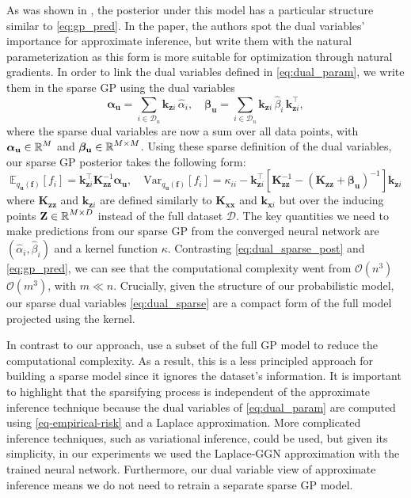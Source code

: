 \documentclass{article}
\newcommand{\dataset}{\ensuremath{\mathcal{D}}}
\newcommand{\mathbold}[1]{\bm{#1}}
\newcommand{\mbf}[1]{\mathbf{#1}}
\newcommand{\MZ}{\mbf{Z}}
\newcommand{\T}{\top}
\newcommand{\valpha}[0]{\mathbold{\alpha}}
\newcommand{\vbeta}[0]{\mathbold{\beta}}
\newcommand{\vf}{\mbf{f}}
\newcommand{\vu}{\mbf{u}}
\newcommand{\vx}{\mbf{x}}
\newcommand{\MKzz}{\mbf{K}_{\mbf{z}\mbf{z}}}
\newcommand{\MKxx}{\mbf{K}_{\mbf{x}\mbf{x}}}
\newcommand{\vkzi}{\mbf{k}_{\mbf{z}i}}
\newcommand{\vkzs}{\mbf{k}_{\mbf{z}i}}
\newcommand{\vk}{\mbf{k}}
\newcommand{\myexpect}{\mathbb{E}}
\begin{document}
As was shown in \cite{adam2021dual}, the posterior under this model has a particular structure similar to \cref{eq:gp_pred}. In the paper, the authors spot the dual variables' importance for approximate inference, but write them with the natural parameterization as this form is more suitable for optimization through natural gradients. In order to link the dual variables defined in \cref{eq:dual_param}, we write them in the sparse GP using the dual variables
\begin{equation} 
	\valpha_{\vu}  =  \sum_{i \in \mathcal{D}_{n}}  \vkzi \, \hat{\alpha}_{i}, \quad
	\vbeta_{\vu} =  \sum_{i \in \mathcal{D}_{n}} \vkzi \,\hat{\beta}_{i} \, \vkzi^{\T} ,    
\label{eq:dual_sparse}
\end{equation}
where the sparse dual variables are now a sum over all data points, with $\valpha_{\vu} \in \R^{M}$ and $\vbeta_{\vu} \in \R^{M  \times M}$. Using these sparse definition of the dual variables, our sparse GP posterior takes the following form:
\begin{equation}\label{eq:dual_sparse_post}
   \myexpect_{q_{\vu}(\vf)}[f_i] = \vkzs^{\T} \MKzz^{-1}   \valpha_{\vu} , \quad 
   \textrm{Var}_{q_{\vu}(\vf)}[f_i]  = \kappa_{ii} - \vkzs^\top [\MKzz^{-1} - (\MKzz + \vbeta_{\vu})^{-1} ]\vkzs
\end{equation}
where $\MKzz$ and $\vkzs$ are defined similarly to $\MKxx$ and $\vk_{\vx i}$ but over the inducing points $\MZ \in \R^{M \times D} $  instead of the full dataset $\dataset$. The key quantities we need to make predictions from our sparse GP from the converged neural network are $(\hat{\alpha}_i, \hat{\beta}_i)$ and a kernel function $\kappa$. Contrasting \cref{eq:dual_sparse_post} and \cref{eq:gp_pred}, we can see that the computational complexity went from $\mathcal{O}(n^3)$  $\mathcal{O}(m^3)$, with $m \ll n$.  Crucially, given the structure of our probabilistic model, our sparse dual variables \cref{eq:dual_sparse} are a compact form  of the full model projected using the kernel. 

In contrast to our approach, \citet{immer2021improving} use a subset of the full GP model  to reduce the computational complexity. As a result, this is a less principled approach for building a sparse model since it ignores the dataset's information. It is important to highlight that the sparsifying process is independent of the approximate inference technique because the dual variables of \cref{eq:dual_param} are computed using \cref{eq-empirical-risk} and a Laplace approximation.
More complicated inference techniques, such as variational inference, could be used, but given its simplicity, in our experiments we used the Laplace-GGN approximation with the trained neural network. Furthermore, our dual variable view of approximate inference means we do not need to retrain a separate sparse GP model. 
\end{document}
